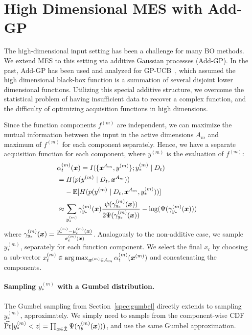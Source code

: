 \section{High Dimensional MES with Add-GP}

%
The high-dimensional input setting has been a challenge for many BO methods. 
We extend MES to this setting via additive Gaussian processes (Add-GP). In the past, Add-GP has been used and analyzed for GP-UCB~\cite{kandasamy2015high}, which assumed the high dimensional black-box function is a summation of several disjoint lower dimensional functions. Utilizing this special additive structure, we overcome the statistical problem of having insufficient data to recover a complex function, and the difficulty of optimizing acquisition functions in high dimensions.

Since the function components $f^{(m)}$ are independent, %
we can maximize the mutual information between the input in the active dimensions $A_m$ and maximum of $f^{(m)}$ for each component separately. Hence, we have a separate acquisition function for each component, where $y^{(m)}$ is the evaluation of $f^{(m)}$:
%
\begin{align}
&\alpha^{(m)}_t({\boldsymbol{x}}) = 
I(\{{\boldsymbol{x}}^{A_m},y^{(m)}\}; y^{(m)}_*\mid D_t) \\
&= H(p(y^{(m)}\mid D_t, {\boldsymbol{x}}^{A_m})) \nonumber \\
&\;\;\;\;- \mathbb E[H(p(y^{(m)}\mid D_t, {\boldsymbol{x}}^{A_m}, y^{(m)}_*)) ] \label{eq:addmes} \\
& \approx \sum_{y_*^{(m)}} \gamma^{(m)}_{y_*}( {\boldsymbol{x}})\frac{\psi(\gamma^{(m)}_{y_*}( {\boldsymbol{x}}))}{2\Psi(\gamma^{(m)}_{y_*}({\boldsymbol{x}}))}  - \log(\Psi(\gamma^{(m)}_{y_*}( {\boldsymbol{x}}))) \label{eq:addmesapprox}
\end{align}
where $\gamma^{(m)}_{y_*}({\boldsymbol{x}}) = \frac{y^{(m)}_* - \mu^{(m)}_t({\boldsymbol{x}})}{\sigma^{(m)}_t({\boldsymbol{x}})}$. Analogously to the non-additive case, we sample $y^{(m)}_*$, separately for each function component. %
We select the final $x_t$ by choosing a sub-vector $x_t^{(m)} \in \arg\max_{{\boldsymbol{x}}^{(m)} \in A_m} \alpha^{(m)}_t({\boldsymbol{x}}^{(m)})$ and concatenating the components.

\paragraph{Sampling $y^{(m)}_*$ with a Gumbel distribution.}
The Gumbel sampling from Section~\ref{spec:gumbel} directly extends to sampling $y^{(m)}_*$, approximately. We simply need to sample from the component-wise CDF $\widehat{\Pr}[{y}^{(m)}_* < z] = \prod_{{\boldsymbol{x}}\in\hat{\mathfrak X}} \Psi(\gamma^{(m)}_y({\boldsymbol{x}})))$, and use the same Gumbel approximation.
%


